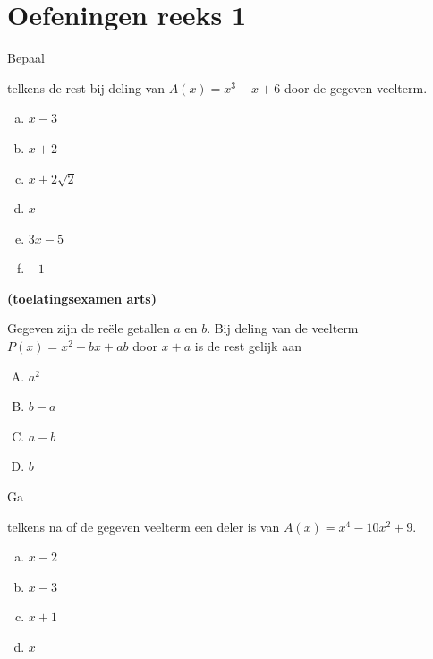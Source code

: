 \documentclass{ximera}
\begin{document}
\section*{Oefeningen reeks 1}
\begin{Oefening}\setcounter{enumi}{1}
\hypertarget{oef3.1}{Bepaal} telkens de rest bij deling van $A(x) = x^3-x+6$ door de gegeven veelterm.
\begin{multicols}{2}
\begin{enumerate}[(a)]
\item
$x-3$
\item
$x+2$
\item
$x + 2\sqrt{2}$
\item
$x$
\item
$3x-5$
\item
$-1$
\end{enumerate}
\end{multicols}
\end{Oefening}

\begin{Oefening}\setcounter{enumi}{2}
\hypertarget{oef3.2}{{\bf (toelatingsexamen arts)}} 
Gegeven zijn de re\"ele getallen $a$ en $b$. Bij deling van de veelterm $P(x) = x^2 + bx + ab$ door $x+a$ is de rest gelijk aan
\begin{multicols}{4}
\begin{enumerate}[(A)]
\item 
$a^2$
\item 
$b-a$ 
\item 
$a-b$ 
\item 
$b$
\end{enumerate}
\end{multicols}
\end{Oefening}

\begin{Oefening}\setcounter{enumi}{3}
\hypertarget{oef3.3}{Ga} telkens na of de gegeven veelterm een deler is van $A(x) = x^4 - 10x^2 + 9$. 
\begin{multicols}{2}
\begin{enumerate}[(a)]
\item
$x-2$
\item
$x-3$
\item
$x+1$
\item
$x$
\end{enumerate}
\end{multicols}
\end{Oefening}
\end{document}
